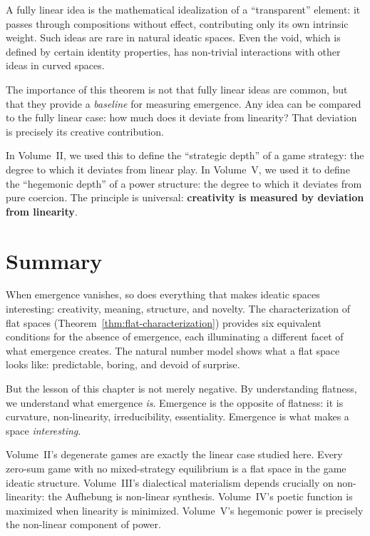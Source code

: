 \begin{interpretation}
A fully linear idea is the mathematical idealization of a ``transparent''
element: it passes through compositions without effect, contributing only its
own intrinsic weight. Such ideas are rare in natural ideatic spaces. Even the
void, which is defined by certain identity properties, has non-trivial
interactions with other ideas in curved spaces.

The importance of this theorem is not that fully linear ideas are common, but
that they provide a \emph{baseline} for measuring emergence. Any idea can be
compared to the fully linear case: how much does it deviate from linearity?
That deviation is precisely its creative contribution.

In Volume~II, we used this to define the ``strategic depth'' of a game
strategy: the degree to which it deviates from linear play. In Volume~V, we
used it to define the ``hegemonic depth'' of a power structure: the degree to
which it deviates from pure coercion. The principle is universal:
\textbf{creativity is measured by deviation from linearity}.
\end{interpretation}

\section{Summary}

When emergence vanishes, so does everything that makes ideatic spaces interesting:
creativity, meaning, structure, and novelty. The characterization of flat spaces
(Theorem~\ref{thm:flat-characterization}) provides six equivalent conditions for
the absence of emergence, each illuminating a different facet of what emergence
creates. The natural number model shows what a flat space looks like: predictable,
boring, and devoid of surprise.

But the lesson of this chapter is not merely negative. By understanding
flatness, we understand what emergence \emph{is}. Emergence is the opposite
of flatness: it is curvature, non-linearity, irreducibility, essentiality.
Emergence is what makes a space \emph{interesting}.

Volume~II's degenerate games are exactly the linear case studied here. Every
zero-sum game with no mixed-strategy equilibrium is a flat space in the game
ideatic structure. Volume~III's dialectical materialism depends crucially on
non-linearity: the Aufhebung is non-linear synthesis. Volume~IV's poetic
function is maximized when linearity is minimized. Volume~V's hegemonic power
is precisely the non-linear component of power.

